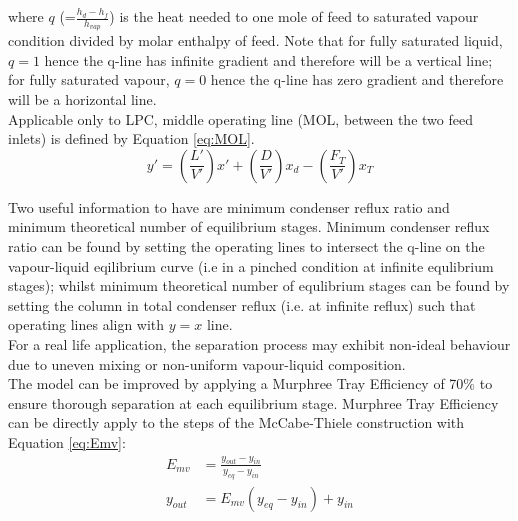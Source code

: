         where $q$ (=$\frac{h_d-h_f}{h_{vap}}$) is the heat needed to one mole of feed to saturated vapour condition divided by molar enthalpy of feed. Note that for fully saturated liquid, $q = 1$ hence the q-line has infinite gradient and therefore will be a vertical line; for fully saturated vapour, $q = 0$ hence the q-line has zero gradient and therefore will be a horizontal line.\\
        Applicable only to LPC, middle operating line (MOL, between the two feed inlets) is defined by Equation \ref{eq:MOL}. \\
        \begin{equation}
            y' = \left(\frac{L'}{V'}\right)x' + \left(\frac{D}{V'}\right)x_d -  \left(\frac{F_T}{V'}\right)x_T
            \label{eq:MOL}
        \end{equation}
        
        \noindent Two useful information to have are minimum condenser reflux ratio and minimum theoretical number of equilibrium stages. Minimum condenser reflux ratio can be found by setting the operating lines to intersect the q-line on the vapour-liquid eqilibrium curve (i.e in a pinched condition at infinite equlibrium stages); whilst minimum theoretical number of equlibrium stages can be found by setting the column in total condenser reflux (i.e. at infinite reflux) such that operating lines align with $y=x$ line.\\
        For a real life application, the separation process may exhibit non-ideal behaviour due to uneven mixing or non-uniform vapour-liquid composition. \\
        The model can be improved by applying a Murphree Tray Efficiency of 70\% to ensure thorough separation at each equilibrium stage. Murphree Tray Efficiency can be directly apply to the steps of the McCabe-Thiele construction with Equation \ref{eq:Emv}: \\
        \begin{equation}
            \begin{aligned}
                E_{mv} & = \frac{y_{out} - y_{in}}{y_{eq} - y_{in}} \\
                y_{out} & = E_{mv}\left(y_{eq}-y_{in}\right) + y_{in}
            \end{aligned}
            \label{eq:Emv}
        \end{equation}
        
